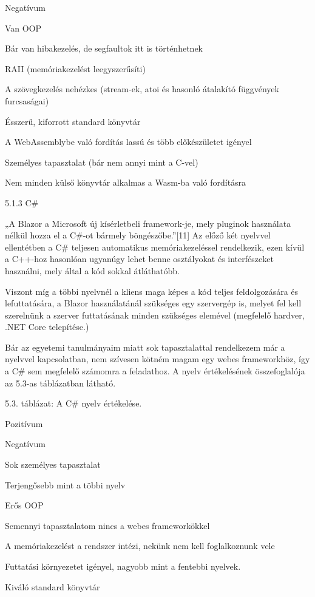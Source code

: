 Negatívum

Van OOP

Bár van hibakezelés, de segfaultok itt is történhetnek

RAII (memóriakezelést leegyszerűsíti)

A szövegkezelés nehézkes (stream-ek, atoi és hasonló átalakító függvények furcsaságai)

Ésszerű, kiforrott standard könyvtár

A WebAssemblybe való fordítás lassú és több előkészületet igényel

Személyes tapasztalat (bár nem annyi mint a C-vel)

Nem minden külső könyvtár alkalmas a Wasm-ba való fordításra



5.1.3 C\# 

„A Blazor a Microsoft új kísérletbeli framework-je, mely pluginok használata nélkül hozza el a C\#-ot bármely böngészőbe.”[11] Az előző két nyelvvel ellentétben a C\# teljesen automatikus memóriakezeléssel rendelkezik, ezen kívül a C++-hoz hasonlóan ugyanúgy lehet benne osztályokat és interfészeket használni, mely által a kód sokkal átláthatóbb.

Viszont míg a többi nyelvnél a kliens maga képes a kód teljes feldolgozására és lefuttatására, a Blazor használatánál szükséges egy szervergép is, melyet fel kell szerelnünk a szerver futtatásának minden szükséges elemével (megfelelő hardver, .NET Core telepítése.)

Bár az egyetemi tanulmányaim miatt sok tapasztalattal rendelkezem már a nyelvvel kapcsolatban, nem szívesen kötném magam egy webes frameworkhöz, így a C\# sem megfelelő számomra a feladathoz. A nyelv értékelésének összefoglalója az 5.3-as táblázatban látható.

5.3. táblázat: A C\# nyelv értékelése.

Pozitívum

Negatívum

Sok személyes tapasztalat

Terjengősebb mint a többi nyelv

Erős OOP

Semennyi tapasztalatom nincs a webes frameworkökkel

A memóriakezelést a rendszer intézi, nekünk nem kell foglalkoznunk vele

Futtatási környezetet igényel, nagyobb mint a fentebbi nyelvek.

Kiváló standard könyvtár



